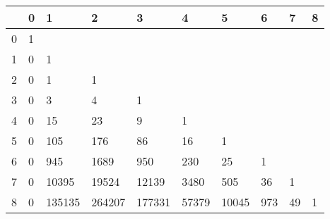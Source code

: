 \documentclass[12pt,reqno]{article}
\numberwithin{sfootnote}{section}
\newcommand{\subtablewidth}{\textwidth}
\newcommand{\subtableskip}{\bigskip}
\newcommand{\trianglenk}[2]{$_{#1}\diagdown^{k#2}$}
\renewcommand{\trianglenk}[2]{\smaller{\diagbox{#1}{#2}}}
\numberwithin{equation}{section}
\theoremstyle{DefaultTheoremStyle}
\theoremstyle{definition}
\newcommand{\gkpSI}[2]{\ensuremath{\genfrac{\lbrack}{\rbrack}{0pt}{}{#1}{#2}}}
\newcommand{\FcfII}[3]{\ensuremath{\gkpSI{#2}{#3}_{#1}}}
\begin{document}
\begin{table}[ht] 

\smaller 
\centering 

\begin{subtable}{\subtablewidth} 
\centering 

%

\begin{tabular}{|c||lllllllll|} \hline\hline 
\trianglenk{n}{k} 
  & 0 & 1      & 2      & 3      & 4     & 5     & 6   & 7  & 8 \\ \hline 
0 & 1 &        &        &        &       &       &     &    &   \\ 
1 & 0 & 1      &        &        &       &       &     &    &   \\ 
2 & 0 & 1      & 1      &        &       &       &     &    &   \\ 
3 & 0 & 3      & 4      & 1      &       &       &     &    &   \\ 
4 & 0 & 15     & 23     & 9      & 1     &       &     &    &   \\ 
5 & 0 & 105    & 176    & 86     & 16    & 1     &     &    &   \\ 
6 & 0 & 945    & 1689   & 950    & 230   & 25    & 1   &    &   \\ 
7 & 0 & 10395  & 19524  & 12139  & 3480  & 505   & 36  & 1  &   \\ 
8 & 0 & 135135 & 264207 & 177331 & 57379 & 10045 & 973 & 49 & 1 \\ 
\hline\hline 
\end{tabular} 


\end{subtable}
\end{table}
\end{document}
